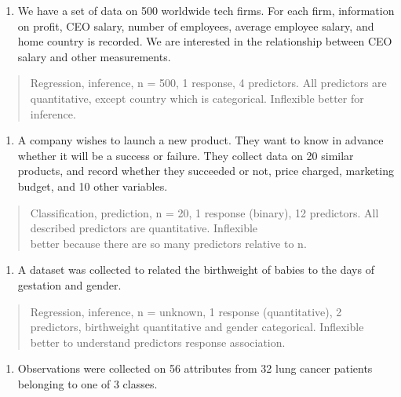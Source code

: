 \documentclass[]{article}
\providecommand{\tightlist}{%
  \setlength{\itemsep}{0pt}\setlength{\parskip}{0pt}}
\begin{document}
\begin{enumerate}
\def\labelenumi{(\alph{enumi})}
\tightlist
\item
  We have a set of data on 500 worldwide tech firms. For each firm,
  information on profit, CEO salary, number of employees, average
  employee salary, and home country is recorded. We are interested in
  the relationship between CEO salary and other measurements.
\end{enumerate}

\begin{quote}
Regression, inference, n = 500, 1 response, 4 predictors. All predictors
are quantitative, except country which is categorical. Inflexible better
for inference.
\end{quote}

\begin{enumerate}
\def\labelenumi{(\alph{enumi})}
\setcounter{enumi}{1}
\tightlist
\item
  A company wishes to launch a new product. They want to know in advance
  whether it will be a success or failure. They collect data on 20
  similar products, and record whether they succeeded or not, price
  charged, marketing budget, and 10 other variables.
\end{enumerate}

\begin{quote}
Classification, prediction, n = 20, 1 response (binary), 12 predictors.
All described predictors are quantitative. Inflexible\\
better because there are so many predictors relative to n.
\end{quote}

\begin{enumerate}
\def\labelenumi{(\alph{enumi})}
\setcounter{enumi}{2}
\tightlist
\item
  A dataset was collected to related the birthweight of babies to the
  days of gestation and gender.
\end{enumerate}

\begin{quote}
Regression, inference, n = unknown, 1 response (quantitative), 2
predictors, birthweight quantitative and gender categorical. Inflexible
better to understand predictors response association.
\end{quote}

\begin{enumerate}
\def\labelenumi{(\alph{enumi})}
\setcounter{enumi}{3}
\tightlist
\item
  Observations were collected on 56 attributes from 32 lung cancer
  patients belonging to one of 3 classes.
\end{enumerate}
\end{document}

